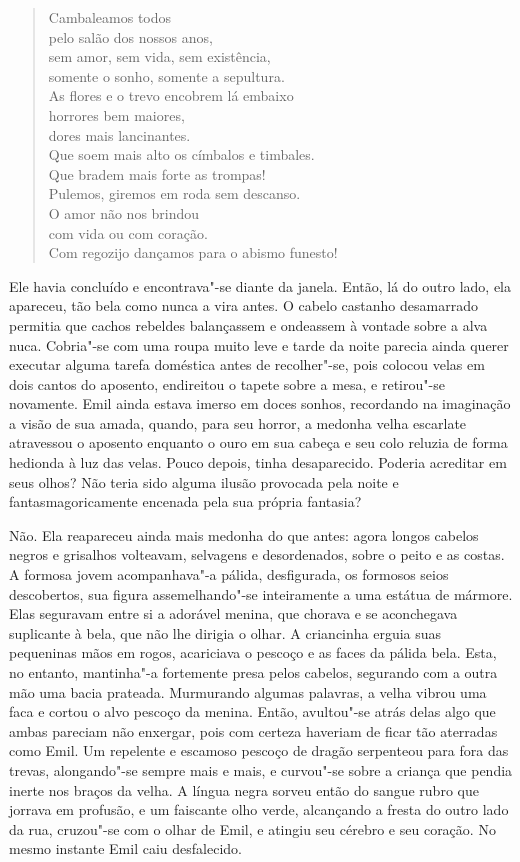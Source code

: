 \begin{verse}
Cambaleamos todos\\
pelo salão dos nossos anos,\\
sem amor, sem vida, sem existência,\\
somente o sonho, somente a sepultura.\\
As flores e o trevo encobrem lá embaixo\\ 
horrores bem maiores,\\
dores mais lancinantes.\\
Que soem mais alto os címbalos e timbales.\\
Que bradem mais forte as trompas!\\
Pulemos, giremos em roda sem descanso.\\
O amor não nos brindou\\
com vida ou com coração.\\
Com regozijo dançamos para o abismo funesto! 
\end{verse}


Ele havia concluído e encontrava"-se diante da janela. Então, lá do outro
lado, ela apareceu, tão bela como nunca a vira antes. O cabelo castanho
desamarrado permitia que cachos rebeldes balançassem e ondeassem à
vontade sobre a alva nuca. Cobria"-se com uma roupa muito leve e tarde
da noite parecia ainda querer executar alguma tarefa doméstica antes de
recolher"-se, pois colocou velas em dois cantos do aposento, endireitou
o tapete sobre a mesa, e retirou"-se novamente. Emil ainda estava imerso
em doces sonhos, recordando na imaginação a visão de sua amada, quando,
para seu horror, a medonha velha escarlate atravessou o aposento
enquanto o ouro em sua cabeça e seu colo reluzia de forma hedionda à
luz das velas. Pouco depois, tinha desaparecido. Poderia acreditar em
seus olhos? Não teria sido alguma ilusão provocada pela noite e
fantasmagoricamente encenada pela sua própria fantasia?

Não. Ela reapareceu ainda mais medonha do que antes: agora longos
cabelos negros e grisalhos volteavam, selvagens e desordenados, sobre o
peito e as costas. A formosa jovem acompanhava"-a pálida, desfigurada,
os formosos seios descobertos, sua figura assemelhando"-se inteiramente
a uma estátua de mármore. Elas seguravam entre si a adorável menina,
que chorava e se aconchegava suplicante à bela, que não lhe dirigia o
olhar. A criancinha erguia suas pequeninas mãos em rogos, acariciava o
pescoço e as faces da pálida bela. Esta, no entanto, mantinha"-a
fortemente presa pelos cabelos, segurando com a outra mão uma bacia
prateada. Murmurando algumas palavras, a velha vibrou uma faca e cortou
o alvo pescoço da menina. Então, avultou"-se atrás delas algo que ambas
pareciam não enxergar, pois com certeza haveriam de ficar tão aterradas
como Emil. Um repelente e escamoso pescoço de dragão serpenteou para
fora das trevas, alongando"-se sempre mais e mais, e curvou"-se sobre a
criança que pendia inerte nos braços da velha. A língua negra sorveu
então do sangue rubro que jorrava em profusão, e um faiscante olho
verde, alcançando a fresta do outro lado da rua, cruzou"-se com o olhar
de Emil, e atingiu seu cérebro e seu coração. No mesmo instante Emil
caiu desfalecido.

